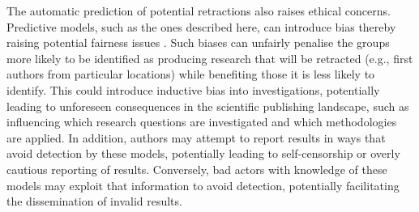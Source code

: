 \documentclass[pdflatex,sn-mathphys-num]{sn-jnl}%
\begin{document}
The automatic prediction of potential retractions also raises ethical concerns. Predictive models, such as the ones described here, can introduce bias thereby raising potential fairness issues \cite{caton2024fairness,mehrabi2021survey}.  
Such biases can unfairly penalise the groups more likely to be identified as producing research that will be retracted (e.g., first authors from particular locations) while benefiting those it is less likely to identify. This could introduce inductive bias into investigations, potentially leading to unforeseen consequences in the scientific publishing landscape, such as influencing which research questions are investigated and which methodologies are applied. In addition, authors may attempt to report results in ways that avoid detection by these models, potentially leading to self-censorship or overly cautious reporting of results. Conversely, bad actors with knowledge of these models may exploit that information to avoid detection, potentially facilitating the dissemination of invalid results. 
\end{document}
